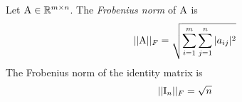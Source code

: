 \begin{example}
    Let $\mathrm{A} \in \mathbb{R}^{m \times n}$. The \textit{Frobenius norm} of $\mathrm{A}$ is
    $$ ||\mathrm{A}||_F = \sqrt{\sum_{i=1}^{m}\sum_{j=1}^{n}{|a_{ij}|^2}} $$
    The Frobenius norm of the identity matrix is
    $$ ||\mathrm{I}_n||_F = \sqrt{n} $$
\end{example}